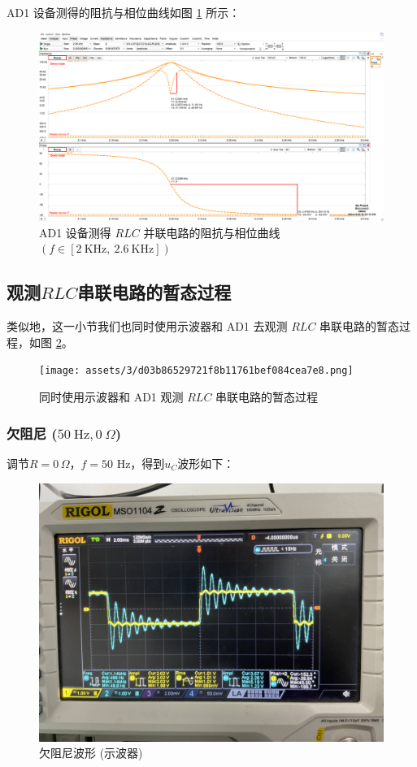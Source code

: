 \documentclass[UTF8]{article}
\theoremstyle{MyLineTheoremStyle} %
\theoremstyle{MyBlockTheoremStyle} %
\theoremstyle{MySubsubsectionStyle} %
\begin{document}
AD1 设备测得的阻抗与相位曲线如图 \ref{RLC 并联电路阻抗与相位曲线} 所示：
\begin{figure}[H]\centering
    \includegraphics[width=\columnwidth]{assets/2/20241224 RLC 实验, RLC 并联, 阻抗曲线.png}
    \caption{AD1 设备测得 $RLC$ 并联电路的阻抗与相位曲线 $(f \in [2 \ \mathrm{KHz},\ 2.6 \ \mathrm{KHz}])$}
    \label{RLC 并联电路阻抗与相位曲线}
\end{figure}


\subsection{观测$ RLC $串联电路的暂态过程}

类似地，这一小节我们也同时使用示波器和 AD1 去观测 $RLC$ 串联电路的暂态过程，如图 \ref{AD1 RLC 串联电路暂态过程}。
\begin{figure}[H]\centering
    \texttt{[image: assets/3/d03b86529721f8b11761bef084cea7e8.png]}
    \caption{同时使用示波器和 AD1 观测 $RLC$ 串联电路的暂态过程}
    \label{AD1 RLC 串联电路暂态过程}
\end{figure}


\subsubsection{欠阻尼 ($ 50\ \mathrm{Hz}, 0 \ \Omega$)}

调节$ R=0\,\Omega $，$f = 50$ Hz，得到$ u_C $波形如下：
\begin{figure}[H]\centering
    \includegraphics[width=0.9\columnwidth]{assets/3/0f8c992ad87b9eae1916428d4d32a128_720.png}
    \caption{欠阻尼波形 (示波器)}
\end{figure}
\end{document}
